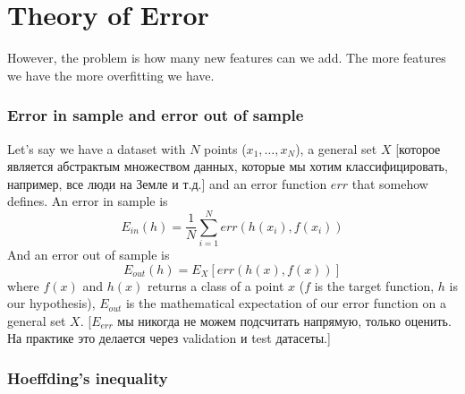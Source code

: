\section{Theory of Error}

However, the problem is how many new features can we add. The more features we have the more overfitting we have.

\hypertarget{ein_and_eout}{}
\subsubsection*{Error in sample and error out of sample}

Let's say we have a dataset with $N$ points ($x_1,\ldots,x_N$), a general set $X$ [которое является абстрактым множеством данных, которые мы хотим классифицировать, например, все люди на Земле и т.д.] and an error function $err$ that somehow defines. An error in sample is
$$E_{in}(h)=\frac{1}{N}\sum\limits_{i=1}^N err(h(x_i),f(x_i))$$
And an error out of sample is
$$E_{out}(h)=E_X[err\left(h(x), f(x)\right)]$$
where $f(x)$ and $h(x)$ returns a class of a point $x$ ($f$ is the target function, $h$ is our hypothesis), $E_{out}$ is the mathematical expectation of our error function on a general set $X$. [$E_{err}$ мы никогда не можем подсчитать напрямую, только оценить. На практике это делается через validation и test датасеты.]\\

\subsubsection*{Hoeffding's inequality}


